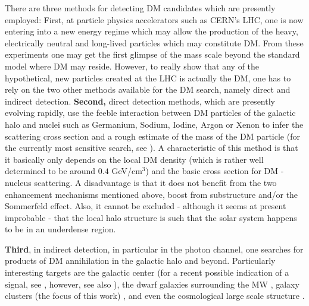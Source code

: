 \documentclass[10pt,aps,pra,reprint,amsmath,amsfonts,amssymb,showpacs,nofootinbib,floatfix]{revtex4-1}
\def\del#1{{}}
\def\C#1{{\bf #1}}
\begin{document}
There are three methods for detecting DM candidates which are
presently employed: First, at particle physics accelerators such as
CERN's LHC, one is now entering into a new energy regime which may
allow the production of the heavy, electrically neutral and long-lived
particles which may constitute DM. From these experiments one may get
the first glimpse of the mass scale beyond the standard model where DM
may reside. However, to really show that any of the hypothetical, new
particles created at the LHC is actually the DM, one has to rely on
the two other methods available for the DM search, namely direct and
indirect detection. \C{Second,} direct detection methods, which are
presently evolving rapidly, use the feeble interaction between DM
particles of the galactic halo and nuclei such as Germanium, Sodium,
Iodine, Argon or Xenon to infer the scattering cross section and a
rough estimate of the mass of the DM particle (for the currently most
sensitive search, see \cite{Aprile:2010um,Aprile:2011hi}). A
characteristic of this method is that it basically only depends on the
local DM density (which is rather well determined to be around $0.4$
GeV/cm$^3$) and the basic cross section for DM - nucleus scattering. A
disadvantage is that it does not benefit from the two enhancement
mechanisms mentioned above, boost from substructure and/or the
Sommerfeld effect. Also, it cannot be excluded - although it seems at
present improbable - that the local halo structure is such that the
solar system happens to be in an underdense region.

\C{Third}, in indirect detection, \del{on the other hand,} in
particular in the photon channel, one searches for products of DM
annihilation in the galactic halo and beyond. Particularly interesting
targets are the galactic center (for a recent possible indication of a
signal, see \cite{2011PhLB..697..412H}, however, see also
\cite{2010arXiv1012.5839B}), the dwarf galaxies surrounding the MW
\cite{Strigari:2006rd,Essig:2009jx,2010JCAP...01..031S}, galaxy
clusters (the focus of this work)
\cite{Ghigna:1998vn,Lewis:2002mfa,Boyarsky:2006kc,2006A&A...455...21C,2009PhRvL.103r1302P},
and even the cosmological large scale structure
\cite{Bergstrom:2001jj,Ullio:2002pj,Taylor:2002zd,Elsaesser:2004ap,2011MNRAS.tmp..503C,Abazajian:2010sq,Abdo:2010dk,Zavala:2011tt}.
\end{document}
